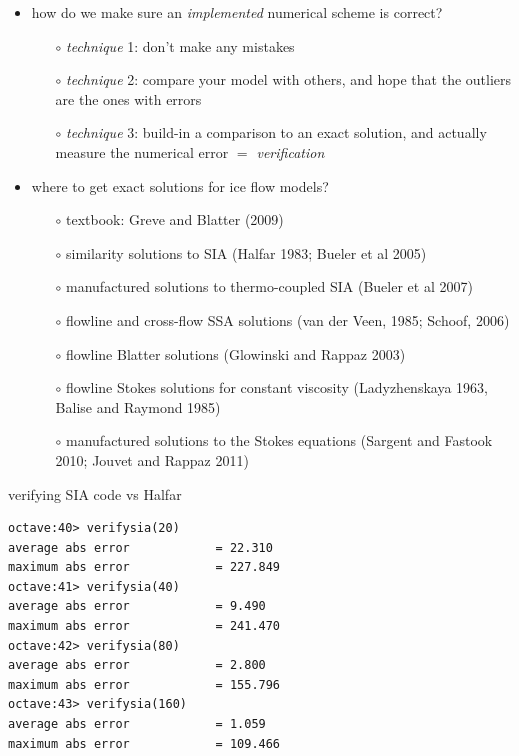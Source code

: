 \documentclass[titlepage,letterpaper,final,12pt]{scrartcl}
\newcommand{\alert}[1]{\emph{#1}}
\begin{document}
\begin{itemize}
\item how do we make sure an \emph{implemented} numerical scheme is correct?
  \begin{itemize}
  \item[$\circ$] \emph{technique} 1: don't make any mistakes
  \item[$\circ$] \emph{technique} 2: compare your model with others, and hope that the outliers are the ones with errors
  \item[$\circ$] \emph{technique} 3: build-in a comparison to an exact solution, and actually measure the numerical error \alert{$=$ verification}
  \end{itemize}
\item where to get exact solutions for ice flow models?
  \begin{itemize}
  \item[$\circ$] textbook: Greve and Blatter (2009)\nocite{GreveBlatter2009}
  \item[$\circ$] similarity solutions to SIA (Halfar 1983\nocite{Halfar83}; Bueler et al 2005\nocite{BLKCB})
  \item[$\circ$] manufactured solutions to thermo-coupled SIA (Bueler et al 2007\nocite{BBL})
  \item[$\circ$] flowline and cross-flow SSA solutions (van der Veen, 1985; Schoof, 2006)\nocite{SchoofStream,vanderVeen85}
  \item[$\circ$] flowline Blatter solutions (Glowinski and Rappaz 2003)\nocite{GlowinskiRappaz}
  \item[$\circ$] flowline Stokes solutions for constant viscosity (Ladyzhenskaya 1963\nocite{Ladyzhenskaya}, Balise and Raymond 1985\nocite{BaliseRaymond1985})
  \item[$\circ$] manufactured solutions to the Stokes equations (Sargent and Fastook 2010; Jouvet and Rappaz 2011)\nocite{JouvetRappaz2011,SargentFastook2010}
  \end{itemize}
\end{itemize}

verifying SIA code vs Halfar

\begin{verbatim}
octave:40> verifysia(20)
average abs error            = 22.310
maximum abs error            = 227.849
octave:41> verifysia(40)
average abs error            = 9.490
maximum abs error            = 241.470
octave:42> verifysia(80)
average abs error            = 2.800
maximum abs error            = 155.796
octave:43> verifysia(160)
average abs error            = 1.059
maximum abs error            = 109.466
\end{verbatim}
\end{document}
